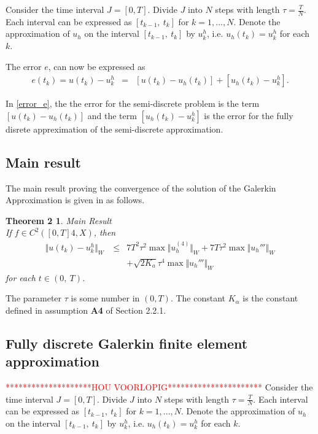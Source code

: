\documentclass[../../main.tex]{subfiles}
\begin{document}
Consider the time interval $J = [0,T]$. Divide $J$ into $N$ steps with length $\tau = \frac{T}{N}$. Each interval can be expressed as $[t_{k-1}, \ t_k]$ for $k = 1,...,N$. Denote the approximation of $u_h$ on the interval $[t_{k-1}, \ t_k]$ by $u_k^h$, i.e. $u_h(t_k) = u_k^h$ for each $k$.

The error $e$, can now be expressed as
\begin{eqnarray}
	e(t_k) = u(t_k) - u^h_k & = & [u(t_k)-u_h(t_k)] + [u_h(t_k) - u^h_k]. \label{error_e}
\end{eqnarray}

In \eqref{error_e}, the the error for the semi-discrete problem is the term $[u(t_k)-u_h(t_k)]$ and the term $[u_h(t_k) - u^h_k]$ is the error for the fully disrete appreximation of the semi-discrete approximation.

\subsection{Main result}

The main result proving the convergence of the solution of the Galerkin
Approximation is given in \cite{BV13} as follows.

\newtheorem*{DC_Thm5}{Theorem 2}
\begin{DC_Thm5}
	{Main Result}\\
	If $f\in C^{2}([0,T]4,X)$, then
	\begin{eqnarray*}
		\Vert u(t_{k})-u_{k}^{h}\Vert_{W}\ & \leq & 7T^{2}\tau^{2}\max\Vert u_{h}^{(4)}\Vert_{W}+7T\tau^{2}\max\Vert u_{h}'''\Vert_{W}\\
		& & + \sqrt{2K_{a}}\tau^{4}\max\Vert u_{h}'''\Vert_{W}
	\end{eqnarray*}
	for each $t\in(0,\ T)$.
\end{DC_Thm5}

The parameter $\tau$ is some number in $(0,T)$. The constant $K_\alpha$ is the
constant defined in assumption \textbf{A4} of Section 2.2.1.

\subsection{Fully discrete Galerkin finite element approximation}
\textcolor{red}{********************HOU VOORLOPIG**********************}
Consider the time interval $J = [0,T]$. Divide $J$ into $N$ steps with length
$\tau = \frac{T}{N}$. Each interval can be expressed as $[t_{k-1}, \ t_k]$ for
$k = 1,...,N$. Denote the approximation of $u_h$ on the interval $[t_{k-1}, \
			t_k]$ by $u_k^h$, i.e. $u_h(t_k) = u_k^h$ for each $k$.\\
\end{document}
